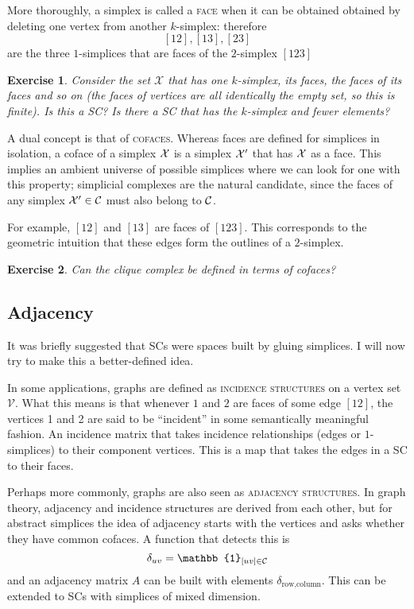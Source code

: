 \documentclass{tufte-handout}
\newtheorem{exercise}{Exercise}
\newcommand{\define}{\textsc}
\newcommand{\ve}{\mathcal{V}}
\begin{document}
More thoroughly, a simplex is called a \define{face} when it can be obtained obtained by deleting one vertex from another $k$-simplex: therefore
\[
[12],[13],[23]
\]
are the three $1$-simplices that are faces of the $2$-simplex $[123]$
\begin{exercise}
Consider the set $\mathcal X$ that has one $k$-simplex, its faces, the faces of its faces and so on (the faces of vertices are all identically the empty set, so this is finite). Is this a SC? Is there a SC that has the $k$-simplex and fewer elements?
\end{exercise}

A dual concept is that of \define{cofaces}. Whereas faces are defined for simplices in isolation, a coface of a simplex $\se$ is a simplex $\se'$ that has $\se$ as a face. This implies an ambient universe of possible simplices where we can look for one with this property; simplicial complexes are the natural candidate, since the faces of any simplex $\se'\in \sc$ must also belong to $\sc$. 

For example, $[12]$ and $[13]$ are faces of $[123]$. This corresponds to the geometric intuition that these edges form the outlines of a $2$-simplex.
\begin{exercise}
Can the clique complex be defined in terms of cofaces?
\end{exercise}


\subsection{Adjacency}

It was briefly suggested that SCs were spaces built by gluing simplices. I will now try to make this a better-defined idea.

In some applications, graphs are defined as \define{incidence structures} on a vertex set $\ve$. What this means is that whenever $1$ and $2$ are faces of some edge $[12]$, the vertices 1 and 2 are said to be ``incident'' in some semantically meaningful fashion. An incidence matrix that takes incidence relationships (edges or $1$-simplices) to their component vertices. This is a map that takes the edges in a SC to their faces.

Perhaps more commonly, graphs are also seen as \define{adjacency structures}. In graph theory,  adjacency and incidence structures are derived from each other, but for abstract simplices the idea of adjacency starts with the vertices and asks whether they have common cofaces. A function that detects this is
\[
\delta_{uv}=\mathbb{1}_{[uv]\in\sc}
\]
and an adjacency matrix $A$ can be built with elements $\delta_{\text{row},\text{column}}$. This can be extended to SCs with simplices of mixed dimension. 
\end{document}
